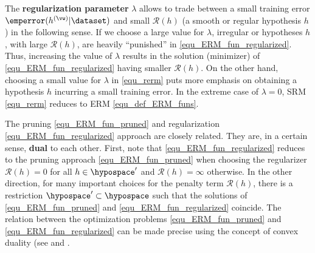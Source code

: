 \documentclass[12pt]{report}
\begin{document}
The {\bf regularization parameter} $\lambda$ allows to trade between a small training error $\emperror(h^{(\vw)}|\dataset)$ 
and small $\mathcal{R}(h)$ (a smooth or regular hypothesis $h$) in the following sense. If we choose a large value for $\lambda$, irregular 
or hypotheses $h$, with large $\mathcal{R}(h)$, are heavily ``punished'' in \eqref{equ_ERM_fun_regularized}. Thus, 
increasing the value of $\lambda$ results in the solution (minimizer) of \eqref{equ_ERM_fun_regularized} having 
smaller $\mathcal{R}(h)$. On the other hand, choosing a small value for $\lambda$ in \eqref{equ_rerm} puts more 
emphasis on obtaining a hypothesis $h$ incurring a small training error. 
In the extreme case of $\lambda =0$, SRM \eqref{equ_rerm} reduces to ERM \eqref{equ_def_ERM_funs}. 

The pruning \eqref{equ_ERM_fun_pruned} and regularization \eqref{equ_ERM_fun_regularized} 
approach are closely related. They are, in a certain sense, {\bf dual} to each other. First, note that 
\eqref{equ_ERM_fun_regularized} reduces to the pruning approach \eqref{equ_ERM_fun_pruned} when 
choosing the regularizer $\mathcal{R}(h) = 0$ for all $h \in \hypospace'$ and $\mathcal{R}(h) = \infty$ 
otherwise. In the other direction, for many important choices for the penalty term $\mathcal{R}(h)$, 
there is a restriction $\hypospace' \subset \hypospace$ such that the solutions of \eqref{equ_ERM_fun_pruned} 
and \eqref{equ_ERM_fun_regularized} coincide. The relation between the optimization problems 
\eqref{equ_ERM_fun_pruned} and \eqref{equ_ERM_fun_regularized} can be made precise using 
the concept of convex duality (see \cite[Ch. 5]{BoydConvexBook} and \cite{BertsekasNonLinProgr}. 








%

\end{document}
